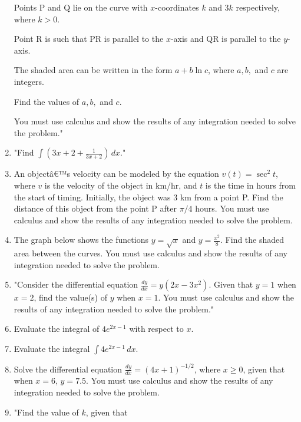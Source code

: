 \documentclass{article}
\begin{document}
\begin{enumerate}
Points P and Q lie on the curve with \( x \)-coordinates \( k \) and \( 3k \) respectively, where \( k > 0 \).

Point R is such that PR is parallel to the \( x \)-axis and QR is parallel to the \( y \)-axis.

The shaded area can be written in the form \( a + b \ln c \), where \( a, b, \) and \( c \) are integers.

Find the values of \( a, b, \) and \( c \).

You must use calculus and show the results of any integration needed to solve the problem."
\vspace{3cm}
\item "Find \(\int \left( 3x + 2 + \frac{1}{3x + 2} \right) \, dx\)."
\vspace{3cm}
\item An objectâ€™s velocity can be modeled by the equation \(v(t) = \sec^2 t\), where \(v\) is the velocity of the object in km/hr, and \(t\) is the time in hours from the start of timing. Initially, the object was 3 km from a point P. Find the distance of this object from the point P after \(\pi/4\) hours. You must use calculus and show the results of any integration needed to solve the problem.
\vspace{3cm}
\item The graph below shows the functions \( y = \sqrt{x} \) and \( y = \frac{x^2}{8} \). Find the shaded area between the curves. You must use calculus and show the results of any integration needed to solve the problem.
\vspace{3cm}
\item "Consider the differential equation \( \frac{dy}{dx} = y(2x - 3x^2) \). Given that \( y = 1 \) when \( x = 2 \), find the value(s) of \( y \) when \( x = 1 \). You must use calculus and show the results of any integration needed to solve the problem."
\vspace{3cm}
\item Evaluate the integral of \(4e^{2x-1}\) with respect to \(x\).
\vspace{3cm}
\item Evaluate the integral \(\int 4e^{2x-1} \, dx\).
\vspace{3cm}
\item Solve the differential equation \(\frac{dy}{dx} = (4x+1)^{-1/2}\), where \(x \geq 0\), given that when \(x = 6\), \(y = 7.5\). You must use calculus and show the results of any integration needed to solve the problem.
\vspace{3cm}
\item "Find the value of \( k \), given that


\end{enumerate}
\end{document}
